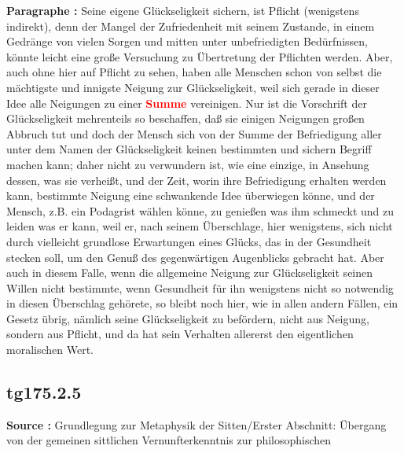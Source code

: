 \documentclass[a4paper,12pt,twoside]{book}
\newcommand{\match}[1]{\textcolor{red}{\textbf{#1}}}
\begin{document}
	\noindent\textbf{Paragraphe : }Seine eigene Glückseligkeit sichern, ist Pflicht (wenigstens indirekt), denn der Mangel der Zufriedenheit mit seinem Zustande, in einem Gedränge von vielen Sorgen und mitten unter unbefriedigten Bedürfnissen, könnte leicht eine große Versuchung zu Übertretung der Pflichten werden. Aber, auch ohne hier auf Pflicht zu sehen, haben alle Menschen schon von selbst die mächtigste und innigste Neigung zur Glückseligkeit, weil sich gerade in dieser Idee alle Neigungen zu einer \match{Summe} vereinigen. Nur ist die Vorschrift der Glückseligkeit mehrenteils so beschaffen, daß sie einigen Neigungen großen Abbruch tut und doch der Mensch sich von der Summe der Befriedigung aller unter dem Namen der Glückseligkeit keinen bestimmten und sichern Begriff machen kann; daher nicht zu verwundern ist, wie eine einzige, in Ansehung dessen, was sie verheißt, und der Zeit, worin ihre Befriedigung erhalten werden kann, bestimmte Neigung eine schwankende Idee überwiegen könne, und der Mensch, z.B. ein Podagrist wählen könne, zu genießen was ihm schmeckt und zu leiden was er kann, weil er, nach seinem Überschlage, hier wenigstens, sich nicht durch vielleicht grundlose Erwartungen eines Glücks, das in der Gesundheit stecken soll, um den Genuß des gegenwärtigen Augenblicks gebracht hat. Aber auch in diesem Falle, wenn die allgemeine Neigung zur Glückseligkeit seinen Willen nicht bestimmte, wenn Gesundheit für ihn wenigstens nicht so notwendig in diesen Überschlag gehörete, so bleibt noch hier, wie in allen andern Fällen, ein Gesetz übrig, nämlich seine Glückseligkeit zu befördern, nicht aus Neigung, sondern aus Pflicht, und da hat sein Verhalten allererst den eigentlichen moralischen Wert. 
	
	\subsection*{tg175.2.5} 
	\textbf{Source : }Grundlegung zur Metaphysik der Sitten/Erster Abschnitt: Übergang von der gemeinen sittlichen Vernunfterkenntnis zur philosophischen\\  
	
\end{document}
